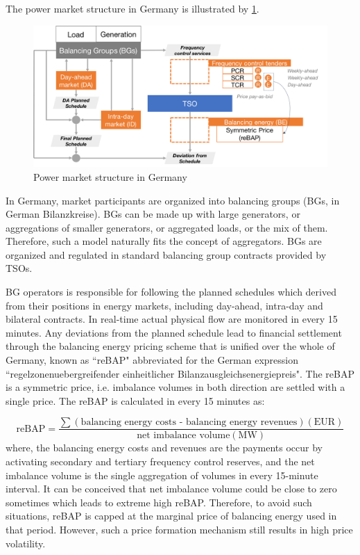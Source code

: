 The power market structure in Germany is illustrated by \ref{fig:de-market-structure}.

\begin{figure}[h!]
	\centering
	\includegraphics[width=0.95\linewidth]{Figures/DE_market-structure}
	\caption{Power market structure in Germany}
	\label{fig:de-market-structure}
\end{figure}

In Germany, market participants are organized into balancing groups (BGs, in German Bilanzkreise). 
BGs can be made up with large generators, or aggregations of smaller generators, or aggregated loads, or the mix of them. Therefore, such a model naturally fits the concept of aggregators. BGs are organized and regulated in standard balancing group contracts provided by TSOs.

BG operators is responsible for following the planned schedules which derived from their positions in energy markets, including day-ahead, intra-day and bilateral contracts. In real-time actual physical flow are monitored in every 15 minutes. Any deviations from the planned schedule lead to financial settlement through the balancing energy pricing scheme that is unified over the whole of Germany, known as ``reBAP" abbreviated for the German expression ``regelzonenuebergreifender einheitlicher Bilanzausgleichsenergiepreis". The reBAP is a symmetric price, i.e. imbalance volumes in both direction are settled with a single price. The reBAP is calculated in every 15 minutes as:

\begin{equation*}
\text{reBAP} = \frac{\sum \left( \text{balancing energy costs - balancing energy revenues}\right)(\text{EUR})}{\text{net imbalance volume} (\text{MW})}
\end{equation*}
where, the balancing energy costs and revenues are the payments occur by activating secondary and tertiary frequency control reserves, and the net imbalance volume is the single aggregation of volumes in every 15-minute interval. It can be conceived that net imbalance volume could be close to zero sometimes which leads to extreme high reBAP. Therefore, to avoid such situations, reBAP is capped at the marginal price of balancing energy used in that period. However, such a price formation mechanism still results in high price volatility.


